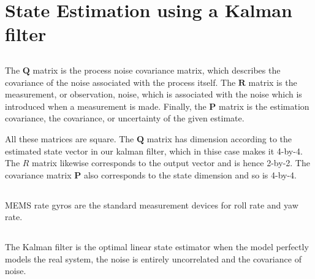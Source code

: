 \section{State Estimation using a Kalman filter}

\subsection{} %
The $\mathbf{Q}$ matrix is the process noise covariance matrix, which describes the covariance of the noise associated with the process itself.  The $\mathbf{R}$ matrix is the measurement, or observation, noise, which is associated with the noise which is introduced when a measurement is made. Finally, the $\mathbf{P}$ matrix is the estimation covariance, the covariance, or uncertainty of the given estimate.

All these matrices are square. The $\mathbf{Q}$ matrix has dimension according to the estimated state vector in our kalman filter, which in thise case makes it 4-by-4. The $R$ matrix likewise corresponds to the output vector and is hence 2-by-2. The covariance matrix $\mathbf{P}$ also corresponds to the state dimension and so is 4-by-4.

\subsection{} %
MEMS rate gyros are the standard measurement devices for roll rate and yaw rate.





\subsection{} %
The Kalman filter is the optimal linear state estimator when the model perfectly models the real system, the noise is entirely uncorrelated and the covariance of noise. 


\subsection{} %



